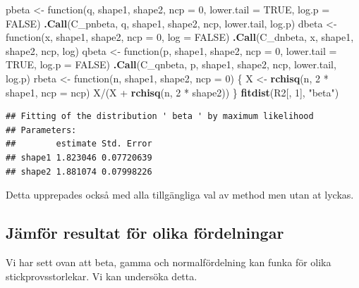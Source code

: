 \documentclass[]{article}
\newenvironment{Shaded}{\begin{snugshade}}{\end{snugshade}}
\newcommand{\KeywordTok}[1]{\textcolor[rgb]{0.13,0.29,0.53}{\textbf{{#1}}}}
\newcommand{\DataTypeTok}[1]{\textcolor[rgb]{0.13,0.29,0.53}{{#1}}}
\newcommand{\DecValTok}[1]{\textcolor[rgb]{0.00,0.00,0.81}{{#1}}}
\newcommand{\StringTok}[1]{\textcolor[rgb]{0.31,0.60,0.02}{{#1}}}
\newcommand{\OtherTok}[1]{\textcolor[rgb]{0.56,0.35,0.01}{{#1}}}
\newcommand{\NormalTok}[1]{{#1}}
\begin{document}
\begin{Shaded}
\begin{Highlighting}[]
\NormalTok{pbeta <-}\StringTok{ }\NormalTok{function(q, shape1, shape2, }\DataTypeTok{ncp =} \DecValTok{0}\NormalTok{, }\DataTypeTok{lower.tail =} \OtherTok{TRUE}\NormalTok{, }\DataTypeTok{log.p =} \OtherTok{FALSE}\NormalTok{) }
  \KeywordTok{.Call}\NormalTok{(C_pnbeta, q, shape1, shape2, ncp, lower.tail, log.p)}
\NormalTok{dbeta <-}\StringTok{ }\NormalTok{function(x, shape1, shape2, }\DataTypeTok{ncp =} \DecValTok{0}\NormalTok{, }\DataTypeTok{log =} \OtherTok{FALSE}\NormalTok{)}
  \KeywordTok{.Call}\NormalTok{(C_dnbeta, x, shape1, shape2, ncp, log)}
\NormalTok{qbeta <-}\StringTok{ }\NormalTok{function(p, shape1, shape2, }\DataTypeTok{ncp =} \DecValTok{0}\NormalTok{, }\DataTypeTok{lower.tail =} \OtherTok{TRUE}\NormalTok{, }\DataTypeTok{log.p =} \OtherTok{FALSE}\NormalTok{)}
  \KeywordTok{.Call}\NormalTok{(C_qnbeta, p, shape1, shape2, ncp, lower.tail, log.p)}
\NormalTok{rbeta <-}\StringTok{ }\NormalTok{function(n, shape1, shape2, }\DataTypeTok{ncp =} \DecValTok{0}\NormalTok{) \{}
        \NormalTok{X <-}\StringTok{ }\KeywordTok{rchisq}\NormalTok{(n, }\DecValTok{2} \NormalTok{*}\StringTok{ }\NormalTok{shape1, }\DataTypeTok{ncp =} \NormalTok{ncp)}
        \NormalTok{X/(X +}\StringTok{ }\KeywordTok{rchisq}\NormalTok{(n, }\DecValTok{2} \NormalTok{*}\StringTok{ }\NormalTok{shape2))}
    \NormalTok{\}}
\KeywordTok{fitdist}\NormalTok{(R2[, }\DecValTok{1}\NormalTok{], }\StringTok{"beta"}\NormalTok{)}
\end{Highlighting}
\end{Shaded}

\begin{verbatim}
## Fitting of the distribution ' beta ' by maximum likelihood 
## Parameters:
##        estimate Std. Error
## shape1 1.823046 0.07720639
## shape2 1.881074 0.07998226
\end{verbatim}

Detta upprepades också med alla tillgängliga val av method men utan at
lyckas.

\subsection{Jämför resultat för olika
fördelningar}\label{jamfor-resultat-for-olika-fordelningar}

Vi har sett ovan att beta, gamma och normalfördelning kan funka för
olika stickprovsstorlekar. Vi kan undersöka detta.
\end{document}
